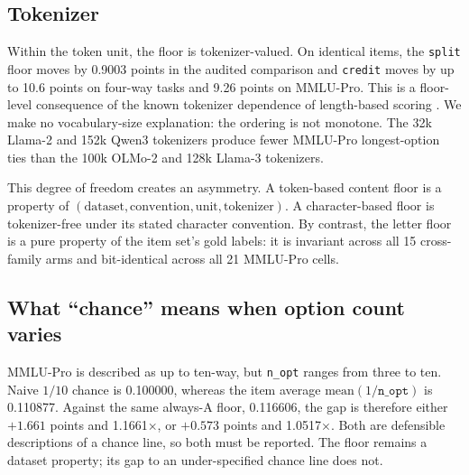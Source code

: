 \subsection{Tokenizer}

Within the token unit, the floor is tokenizer-valued. On identical items, the \texttt{split} floor moves by 0.9003 points in the audited comparison and \texttt{credit} moves by up to 10.6 points on four-way tasks and 9.26 points on MMLU-Pro. This is a floor-level consequence of the known tokenizer dependence of length-based scoring \citep{oostermeijer2026length}. We make no vocabulary-size explanation: the ordering is not monotone. The 32k Llama-2 and 152k Qwen3 tokenizers produce fewer MMLU-Pro longest-option ties than the 100k OLMo-2 and 128k Llama-3 tokenizers.

This degree of freedom creates an asymmetry. A token-based content floor is a property of $(\text{dataset},\text{convention},\text{unit},\text{tokenizer})$. A character-based floor is tokenizer-free under its stated character convention. By contrast, the letter floor is a pure property of the item set's gold labels: it is invariant across all 15 cross-family arms and bit-identical across all 21 MMLU-Pro cells.

\subsection{What ``chance'' means when option count varies}

MMLU-Pro is described as up to ten-way, but \texttt{n\_opt} ranges from three to ten. Naive $1/10$ chance is 0.100000, whereas the item average $\mathrm{mean}(1/\texttt{n\_opt})$ is 0.110877. Against the same always-A floor, 0.116606, the gap is therefore either $+1.661$ points and 1.1661$\times$, or $+0.573$ points and 1.0517$\times$. Both are defensible descriptions of a chance line, so both must be reported. The floor remains a dataset property; its gap to an under-specified chance line does not.




